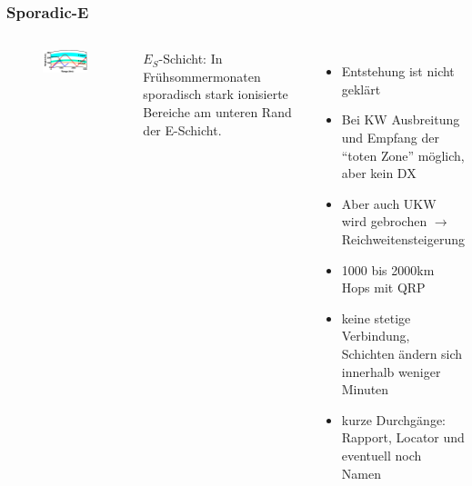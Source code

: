 \begin{frame}
  \frametitle{Sporadic-E}
  \begin{columns}
      \begin{center}
        \begin{figure}
          \includegraphics[width=\textwidth,height=.85\textheight,keepaspectratio]{bv11/SporadicE-NPS.png}
        \end{figure}
      \end{center}
      $E_S$-Schicht: In Frühsommermonaten sporadisch stark ionisierte Bereiche am
      unteren Rand der E-Schicht.

      \begin{itemize}
        \item Entstehung ist nicht geklärt
        \item Bei KW Ausbreitung und Empfang der “toten Zone” möglich, aber kein DX
        \item Aber auch UKW wird gebrochen $\rightarrow$ Reichweitensteigerung
        \item 1000 bis 2000km Hops mit QRP
        \item keine stetige Verbindung, Schichten ändern sich innerhalb weniger Minuten
        \item kurze Durchgänge: Rapport, Locator und eventuell noch Namen
      \end{itemize}
  \end{columns}
\end{frame}

